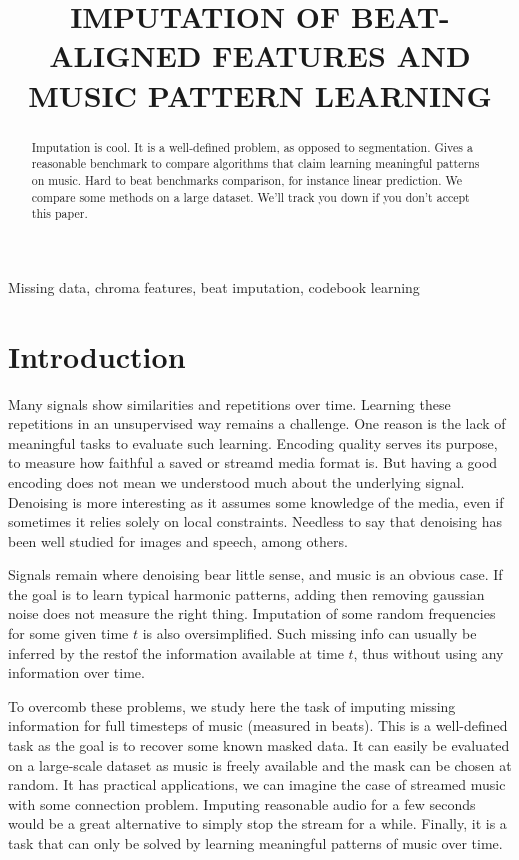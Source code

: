 \documentclass{article}
\title{IMPUTATION OF BEAT-ALIGNED FEATURES AND MUSIC PATTERN LEARNING}
\begin{document}
%
\maketitle
%
\begin{abstract}
Imputation is cool. It is a well-defined problem, as opposed to segmentation.
Gives a reasonable benchmark to compare algorithms that claim learning meaningful
patterns on music. Hard to beat benchmarks comparison, for instance linear
prediction. We compare some methods on a large dataset. We'll track you down
if you don't accept this paper.
\end{abstract}
%
\begin{keywords}
Missing data, chroma features, beat imputation, codebook learning
\end{keywords}
%
\section{Introduction}
\label{sec:intro}
Many signals show similarities and repetitions over time. Learning these repetitions
in an unsupervised way remains a challenge. One reason is the lack of meaningful
tasks to evaluate such learning. Encoding quality serves its purpose, to measure
how faithful a saved or streamd media format is. But having a good encoding
does not mean we understood much about the underlying signal. Denoising is more
interesting as it assumes some knowledge of the media, even if sometimes it relies
solely on local constraints. Needless to say that denoising has been well studied 
for images and speech, among others.

Signals remain where denoising bear little sense, and music is an obvious case.
If the goal is to learn typical harmonic patterns, adding then removing gaussian
noise does not measure the right thing. Imputation of some random frequencies
for some given time $t$ is also oversimplified. Such missing info can usually
be inferred by the restof the information available at time $t$, thus without
using any information over time.

To overcomb these problems, we study here the task of imputing missing information
for full timesteps of music (measured in beats). This is a well-defined task
as the goal is to recover some known masked data. It can easily be evaluated on a
large-scale dataset as music is freely available and the mask can be chosen
at random. It has practical applications, we can imagine the case of streamed music
with some connection problem. Imputing reasonable audio for a few seconds would
be a great alternative to simply stop the stream for a while. Finally, it is a
task that can only be solved by learning meaningful patterns of music over time.
\end{document}
